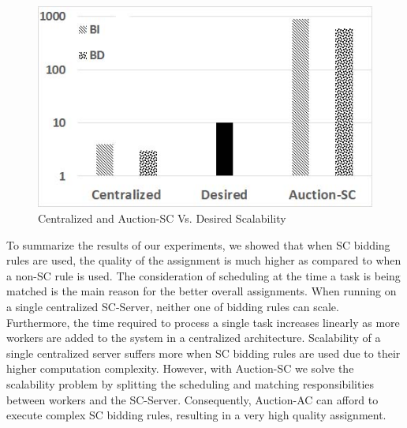 \begin{figure}[h]
	\centering
	\includegraphics[scale=0.25]{figures/scale_req.jpg}
	\vspace{-0.1in}
	\caption{Centralized and Auction-SC Vs. Desired Scalability}\label{fig:req}
\end{figure}

To summarize the results of our experiments, we showed that when SC bidding rules are used, the quality of the assignment is much higher as compared to when a non-SC rule is used. The consideration of scheduling at the time a task is being matched is the main reason for the better overall assignments. When running on a single centralized SC-Server, neither one of bidding rules can scale. Furthermore, the time required to process a single task increases linearly as more workers are added to the system in a centralized architecture. Scalability of a single centralized server suffers more when SC bidding rules are used due to their higher computation complexity. However, with Auction-SC we solve the scalability problem by splitting the scheduling and matching responsibilities between workers and the SC-Server. Consequently, Auction-AC can afford to execute complex SC bidding rules, resulting in a very high quality assignment. %


